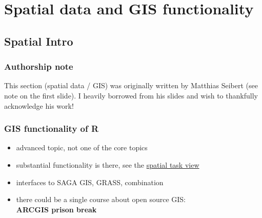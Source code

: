 \documentclass[xcolor=table, xcolor=dvipsnames]{beamer}\usepackage[]{graphicx}\usepackage[]{color}
\begin{document}
\section{Spatial data and GIS functionality}

\subsection{Spatial Intro}

\begin{frame}\frametitle{Authorship note} 
This section (spatial data / GIS) was originally written by Matthias Seibert (see note on the first slide). I heavily borrowed from his slides and wish to thankfully acknowledge his work!
\end{frame}


\begin{frame}[fragile]\frametitle{GIS functionality of R}
\begin{itemize}[<+->]
\item advanced topic, not one of the core topics
\item substantial functionality is there, see the \href{http://cran.r-project.org/web/views/Spatial.html}{spatial task view}
\item interfaces to SAGA GIS, GRASS, combination
\item there could be a single course about open source GIS:\\ \textbf{ARCGIS prison break}
\end{itemize}
\end{frame}

\end{document}

